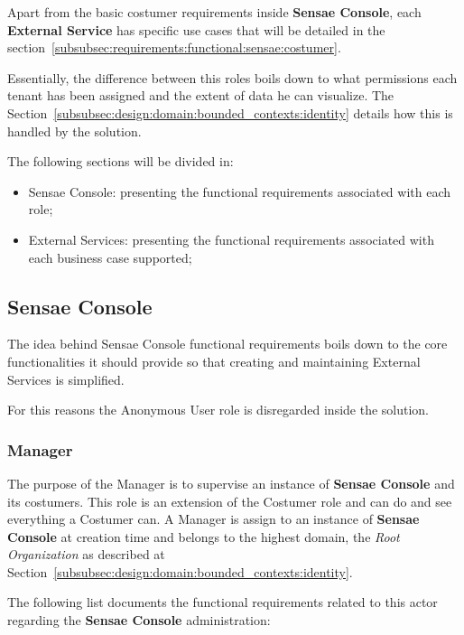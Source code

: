 Apart from the basic costumer requirements inside \textbf{Sensae Console}, each \textbf{External Service} has specific use cases that will be detailed in the section~\ref{subsubsec:requirements:functional:sensae:costumer}.

Essentially, the difference between this roles boils down to what permissions each tenant has been assigned and the extent of data he can visualize. The Section~\ref{subsubsec:design:domain:bounded_contexts:identity} details how this is handled by the solution.

The following sections will be divided in:

\begin{itemize}
    \item Sensae Console: presenting the functional requirements associated with each role;
    \item External Services: presenting the functional requirements associated with each business case supported;
\end{itemize}

\subsection{Sensae Console}
\label{subsec:requirements:functional:sensae}

The idea behind Sensae Console functional requirements boils down to the core functionalities it should provide so that creating and maintaining External Services is simplified.

For this reasons the Anonymous User role is disregarded inside the solution. 

\subsubsection{Manager}
\label{subsubsec:requirements:functional:sensae:manager}

The purpose of the Manager is to supervise an instance of \textbf{Sensae Console} and its costumers. This role is an extension of the Costumer role and can do and see everything a Costumer can. A Manager is assign to an instance of \textbf{Sensae Console} at creation time and belongs to the highest domain, the \textit{Root Organization} as described at Section~\ref{subsubsec:design:domain:bounded_contexts:identity}.

The following list documents the functional requirements related to this actor regarding the \textbf{Sensae Console} administration:

